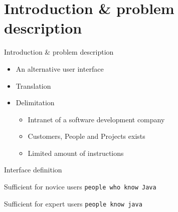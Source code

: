 \section{Introduction \& problem description}
\begin{frame}{Introduction \& problem description} 
    \begin{itemize}
    \item An alternative user interface \pause
    \item Translation \pause %
    \item Delimitation 
      \begin{itemize}
        \item Intranet of a software development company \pause
        \item Customers, People and Projects exists \pause
	    \item Limited amount of instructions
      \end{itemize}
  \end{itemize} 
\end{frame}

\begin{frame}{Interface definition} 
\begin{block}{Sufficient for novice users}
      \texttt{people who know Java}
\end{block}
\pause
\begin{block}{Sufficient for expert users}
      \texttt{people know java}
\end{block}
\end{frame}